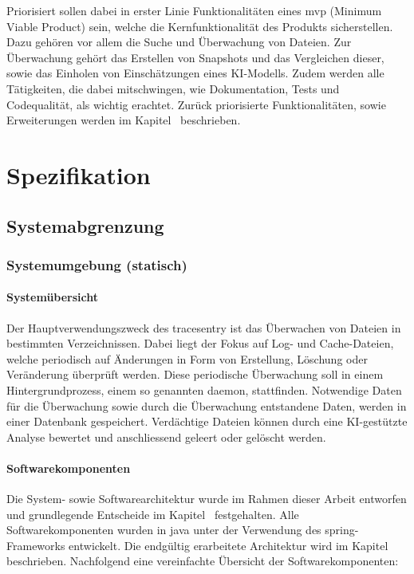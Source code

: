 \documentclass[a4paper,12pt]{report}
\begin{document}
    Priorisiert sollen dabei in erster Linie Funktionalitäten eines \gls{mvp} (Minimum Viable Product) sein, welche die Kernfunktionalität des Produkts sicherstellen.
    Dazu gehören vor allem die Suche und Überwachung von Dateien.
    Zur Überwachung gehört das Erstellen von Snapshots und das Vergleichen dieser, sowie das Einholen von Einschätzungen eines KI-Modells.
    Zudem werden alle Tätigkeiten, die dabei mitschwingen, wie Dokumentation, Tests und Codequalität, als wichtig erachtet.
    Zurück priorisierte Funktionalitäten, sowie Erweiterungen werden im Kapitel~ beschrieben.


    \chapter{Spezifikation}\label{ch:spezifikation}


    \section{Systemabgrenzung}\label{sec:systemabgrenzung}

    \subsection{Systemumgebung (statisch)}\label{subsec:systemumgebung-(statisch)}

    \subsubsection{Systemübersicht}
    Der Hauptverwendungszweck des \gls{tracesentry} ist das Überwachen von Dateien in bestimmten Verzeichnissen.
    Dabei liegt der Fokus auf Log- und Cache-Dateien, welche periodisch auf Änderungen in Form von Erstellung, Löschung oder Veränderung überprüft werden.
    Diese periodische Überwachung soll in einem Hintergrundprozess, einem so genannten \gls{daemon}, stattfinden.
    Notwendige Daten für die Überwachung sowie durch die Überwachung entstandene Daten, werden in einer Datenbank gespeichert.
    Verdächtige Dateien können durch eine KI-gestützte Analyse bewertet und anschliessend geleert oder gelöscht werden.

    \subsubsection{Softwarekomponenten}
    Die System- sowie Softwarearchitektur wurde im Rahmen dieser Arbeit entworfen und grundlegende Entscheide im Kapitel~ festgehalten.
    Alle Softwarekomponenten wurden in \gls{java} unter der Verwendung des \gls{spring}-Frameworks entwickelt.
    Die endgültig erarbeitete Architektur wird im Kapitel~ beschrieben.
    Nachfolgend eine vereinfachte Übersicht der Softwarekomponenten:
\end{document}
